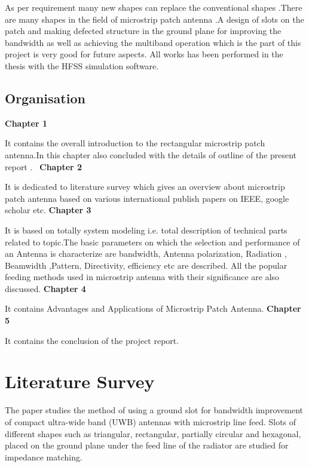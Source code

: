 \documentclass[12pt]{article}
\begin{document}
 \justify
   As per requirement many new shapes can replace the conventional shapes .There are many shapes in the field of microstrip patch antenna .A design of slots on the patch and making defected structure in the ground plane for improving the bandwidth as well as achieving the multiband operation which is the part of this project is very good for future aspects. All works has been performed in the thesis with the HFSS simulation software.

\cleardoublepage


\subsection{Organisation}\label{sub:Organisation}
 \justify
  \textbf{Chapter 1}

      It contains the overall introduction to the rectangular microstrip patch antenna.In this chapter also concluded with the details of outline of the present report .\
 \justify
  \textbf{Chapter 2}

      It is dedicated to literature survey which gives an overview about microstrip patch antenna based on various international publish papers on IEEE, google scholar etc.
 \justify
  \textbf{Chapter 3}

      It is based on totally system modeling i.e. total description of technical parts related to topic.The basic parameters on which the selection and performance of an Antenna is characterize are bandwidth, Antenna polarization, Radiation , Beamwidth ,Pattern, Directivity, efficiency etc are described. All the popular feeding methods used in microstrip antenna with their significance are also discussed.
 \justify
  \textbf{Chapter 4}

      It contains Advantages and Applications of Microstrip Patch Antenna.
 \justify
  \textbf{Chapter 5}

      It contains the conclusion of the project report.
\cleardoublepage
\section{Literature Survey}\label{sec:Literature Survey}
\justify
	The paper studies the method of using a ground slot for bandwidth improvement of compact ultra-wide band (UWB) antennas 	with microstrip line feed. Slots of different shapes such as triangular, rectangular, partially circular and hexagonal, placed on the ground plane under the feed line of the radiator are studied for impedance matching. 
	
\end{document}
